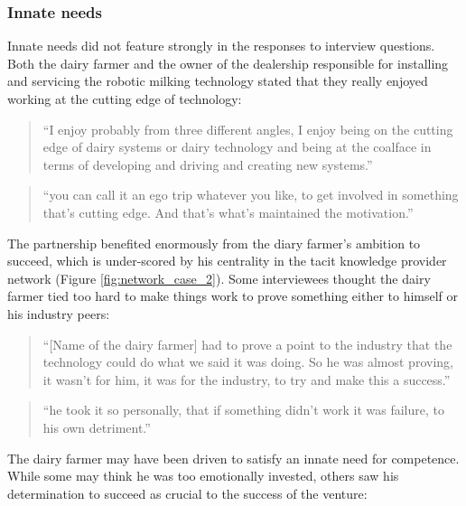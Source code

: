 \subsubsection{Innate needs}

Innate needs did not feature strongly in the responses to interview questions. Both the dairy farmer and the owner of the dealership responsible for installing and servicing the robotic milking technology stated that they really enjoyed working at the cutting edge of technology:

\begin{quote}
\small
\enquote{I enjoy probably from three different angles, I enjoy being on the cutting edge of dairy systems or dairy technology and being at the coalface in terms of developing and driving and creating new systems.} \\
\end{quote}

\begin{quote}
\small
\enquote{you can call it an ego trip whatever you like, to get involved in something that's cutting edge. And that's what's maintained the motivation.} \\
\end{quote}

The partnership benefited enormously from the diary farmer's ambition to succeed, which is under-scored by his centrality in the tacit knowledge provider network (Figure \ref{fig:network_case_2}). Some interviewees thought the dairy farmer tied too hard to make things work to prove something either to himself or his industry peers:

\begin{quote}
\small
\enquote{[Name of the dairy farmer] had to prove a point to the industry that the technology could do what we said it was doing.  So he was almost proving, it wasn't for him, it was for the industry, to try and make this a success.} \\
\end{quote}

\begin{quote}
\small
\enquote{he took it so personally, that if something didn't work it was failure, to his own detriment.} \\
\end{quote}
 
The dairy farmer may have been driven to satisfy an innate need for competence. While some may think he was too emotionally invested, others saw his determination to succeed as crucial to the success of the venture:

